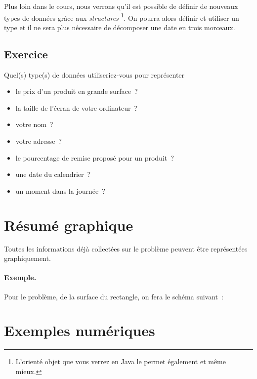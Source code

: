 			Plus loin dans le cours,
			nous verrons qu’il est possible de définir de nouveaux
			types de données grâce aux \emph{structures}%
			\footnote{
				L’orienté objet que vous verrez en Java
				le permet également et même mieux.%
			}. 
			On pourra alors définir et utiliser un type 
			et il ne sera plus nécessaire de décomposer une date en trois
			morceaux.
	
		\subsection{Exercice}
		
			Quel(s) type(s) de données utiliseriez-vous pour représenter 
			\begin{itemize}
				\item le prix d’un produit en grande surface~?
				\item la taille de l’écran de votre ordinateur~?
				\item votre nom~?
				\item votre adresse~?
				\item le pourcentage de remise proposé pour un produit~?
				\item une date du calendrier~?
				\item un moment dans la journée~?
			\end{itemize}
			
	\section{Résumé graphique}
	
		Toutes les informations déjà collectées sur le problème
		peuvent être représentées graphiquement.
	
		\begin{Emphase}
			\paragraph{Exemple.}
			Pour le problème, de la surface du rectangle, 
			on fera le schéma suivant~:
			
			\center{}	
		\end{Emphase}
		
	\section{Exemples numériques}
	
